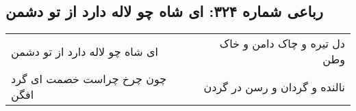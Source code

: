 \begin{center}
\section*{رباعی شماره ۳۲۴: ای شاه چو لاله دارد از تو دشمن}
\label{sec:sh324}
\begin{longtable}{l p{0.5cm} r}
ای شاه چو لاله دارد از تو دشمن
&&
دل تیره و چاک دامن و خاک وطن
\\
چون چرخ چراست خصمت ای گرد افگن
&&
نالنده و گردان و رسن در گردن
\\
\end{longtable}
\end{center}
